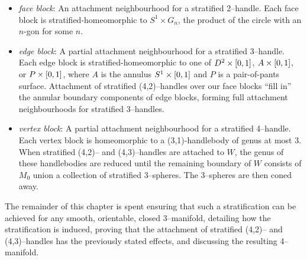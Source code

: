 \begin{itemize}
	\item \emph{face block}:
		An attachment neighbourhood for a stratified 2--handle.
		Each face block is stratified-homeomorphic to $S^1\times G_n$, the product of the circle with an $n$-gon for some $n$.
	
	\item \emph{edge block}:
		A partial attachment neighbourhood for a stratified 3--handle.
		Each edge block is stratified-homeomorphic to one of $D^2\times[0,1]$, $A\times[0,1]$, or $P\times[0,1]$, where $A$ is the annulus $S^1\times[0,1]$ and $P$ is a pair-of-pants surface.
		Attachment of stratified (4,2)--handles over our face blocks ``fill in'' the annular boundary components of edge blocks, forming full attachment neighbourhoods for stratified 3--handles.
		
	\item \emph{vertex block}:
		A partial attachment neighbourhood for a stratified 4--handle.
		Each vertex block is homeomorphic to a (3,1)-handlebody of genus at most 3.
		When stratified (4,2)-- and (4,3)--handles are attached to $W$, the genus of these handlebodies are reduced until the remaining boundary of $W$ consists of $M_0$ union a collection of stratified 3--spheres.  The 3--spheres are then coned away.
\end{itemize}
 
The remainder of this chapter is spent ensuring that such a stratification can be achieved for any smooth, orientable, closed 3--manifold, detailing how the stratification is induced, proving that the attachment of stratified (4,2)-- and (4,3)--handles has the previously stated effects, and discussing the resulting 4--manifold.









%
